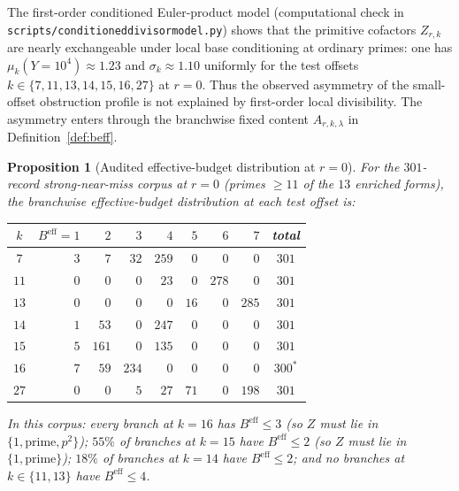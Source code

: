 \documentclass[11pt]{article}
\renewcommand{\_}{\origunderscore\allowbreak}
\newtheorem{proposition}[theorem]{Proposition}
\theoremstyle{definition}
\theoremstyle{remark}
\begin{document}
The first-order conditioned Euler-product model
(computational check in
\texttt{scripts/conditioned\_divisor\_model.py}) shows that the
primitive cofactors $Z_{r,k}$ are nearly exchangeable under local
base conditioning at ordinary primes: one has
$\mu_k(Y=10^4)\approx 1.23$ and $\sigma_k\approx 1.10$ uniformly for
the test offsets $k\in\{7,11,13,14,15,16,27\}$ at $r=0$. Thus the
observed asymmetry of the small-offset obstruction profile is not
explained by first-order local divisibility. The asymmetry enters
through the branchwise fixed content $A_{r,k,\lambda}$ in
Definition~\ref{def:beff}.

\begin{proposition}[Audited effective-budget distribution at $r=0$]\label{prop:beff_r0}
For the $301$-record strong-near-miss corpus at $r=0$ (primes
$\ge 11$ of the $13$ enriched forms), the branchwise effective-budget
distribution at each test offset is:

\begin{center}
\renewcommand{\arraystretch}{1.05}
\begin{tabular}{c|rrrrrrr|c}
\hline
$k$ & $B^{\mathrm{eff}}{=}1$ & $2$ & $3$ & $4$ & $5$ & $6$ & $7$ & total \\
\hline
$7$ & $3$ & $7$ & $32$ & $259$ & $0$ & $0$ & $0$ & $301$ \\
$11$ & $0$ & $0$ & $0$ & $23$ & $0$ & $278$ & $0$ & $301$ \\
$13$ & $0$ & $0$ & $0$ & $0$ & $16$ & $0$ & $285$ & $301$ \\
$14$ & $1$ & $53$ & $0$ & $247$ & $0$ & $0$ & $0$ & $301$ \\
$15$ & $5$ & $161$ & $0$ & $135$ & $0$ & $0$ & $0$ & $301$ \\
$16$ & $7$ & $59$ & $234$ & $0$ & $0$ & $0$ & $0$ & $300^\ast$ \\
$27$ & $0$ & $0$ & $5$ & $27$ & $71$ & $0$ & $198$ & $301$ \\
\hline
\end{tabular}
\end{center}

In this corpus: every branch at $k=16$ has $B^{\mathrm{eff}}\le 3$
(so $Z$ must lie in $\{1, \text{prime}, p^2\}$);
$55\%$ of branches at $k=15$ have $B^{\mathrm{eff}}\le 2$
(so $Z$ must lie in $\{1, \text{prime}\}$);
$18\%$ of branches at $k=14$ have $B^{\mathrm{eff}}\le 2$;
and no branches at $k\in\{11,13\}$ have $B^{\mathrm{eff}}\le 4$.
\end{proposition}
\end{document}
